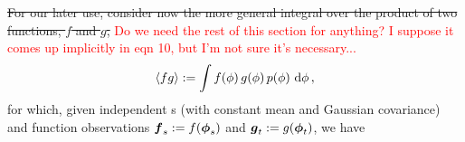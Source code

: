 \documentclass{article}
\begin{document}
\sout{
For our later use, consider now the more general integral over the product of two functions, $f$ and $g$,} \textcolor{red}{Do we need the rest of this section for anything? I suppose it comes up implicitly in eqn 10, but I'm not sure it's necessary...}
$$\inty{f g} \deq \int f(\phi)\,g(\phi)\,\po{\phi}\,\ud\phi\,,$$ 
for which, given independent \gp s (with constant mean and Gaussian covariance) and function observations $\vf_{s} \deq f(\vph_{s})$ and  $\vg_{t} \deq g(\vph_{t})$, we have
% 
\end{document}

